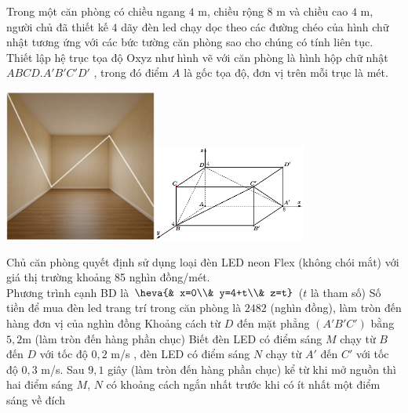 \begin{ex}%
Trong một căn phòng có chiều ngang $4$ m, chiều rộng $8$ m và chiều cao $4$ m, người chủ đã thiết kế $4$ dãy đèn led chạy dọc theo các đường chéo của hình chữ nhật tương ứng với các bức tường căn phòng sao cho chúng có tính liên tục. Thiết lập hệ trục tọa độ Oxyz như hình vẽ với căn phòng là hình hộp chữ nhật $ABCD.A'B'C'D'$ , trong đó điểm $A$ là gốc tọa độ, đơn vị trên mỗi trục là mét.
\begin{center}
    \includegraphics[width=5cm]{img/HXN-8-15a}\qquad \includegraphics[width=5cm]{img/HXN-8-15b}
\end{center}
 Chủ căn phòng quyết định sử dụng loại đèn LED neon Flex (không chói mắt) với giá thị trường khoảng 85 nghìn đồng/mét.\\
 \choiceTF
 {Phương trình cạnh BD là $\heva{& x=0\\& y=4+t\\& z=t}$ ($t$ là tham số)}
 {\True Số tiền để mua đèn led trang trí trong căn phòng là $2482$ (nghìn đồng), làm tròn đến hàng đơn vị của nghìn đồng}
 {Khoảng cách từ $D$ đến mặt phẳng $\left(A'B'C'\right)$ bằng $5{,}2$m (làm tròn đến hàng phần chục)}
 {Biết đèn LED có điểm sáng $M$ chạy từ $B$ đến $D$ với tốc độ $0{,}2$ m/s , đèn LED có điểm sáng $N$ chạy từ $A'$ đến $C'$ với tốc độ $0{,}3$ m/s. Sau $9{,}1$ giây (làm tròn đến hàng phần chục) kể từ khi mở nguồn thì hai điểm sáng $M$, $N$ có khoảng cách ngắn nhất trước khi có ít nhất một điểm sáng về đích}
\end{ex}
